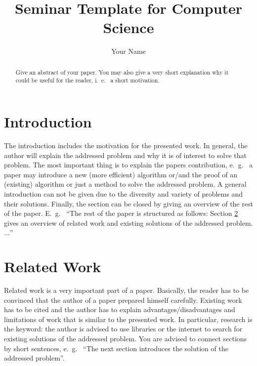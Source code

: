 \documentclass[]{tukseminar}
\title{Seminar Template for Computer Science}
\author{Your Name
  \institute{Technische Universität Kaiserslautern, Department of Computer Science}}
\begin{document}

\maketitle


\begin{abstract}
    Give an abstract of your paper. You may also give a very short explanation why it could be useful for the reader, i.~e.~ a short motivation.
\end{abstract}


\section{Introduction}
\label{sec:introduction}

The introduction includes the motivation for the presented work.
In general, the author will explain the addressed problem and why it is of interest to solve that problem.
The most important thing is to explain the papers contribution, e.~g.~ a paper may introduce a new (more efficient) algorithm or/and the proof of an (existing) algorithm or just a method to solve the addressed problem.
A general introduction can not be given due to the diversity and variety of problems and their solutions.
Finally, the section can be closed by giving an overview of the rest of the paper.
E.~g.~ ``The rest of the paper is structured as follows:
Section \ref{sec:relatedwork} gives an overview of related work and existing solutions of the addressed problem. $\ldots$''

\section{Related Work}
\label{sec:relatedwork}

Related work is a very important part of a paper.
Basically, the reader has to be convinced that the author of a paper prepared himself carefully.
Existing work has to be cited and the author has to explain advantages/disadvantages and limitations of work that is similar to the presented work.
In particular, research is the keyword: the author is advised to use libraries or the internet to search for existing solutions of the addressed problem.
You are advised to connect sections by short sentences, e.~g.~ ``The next section introduces the solution of the addressed problem''.
\end{document}
